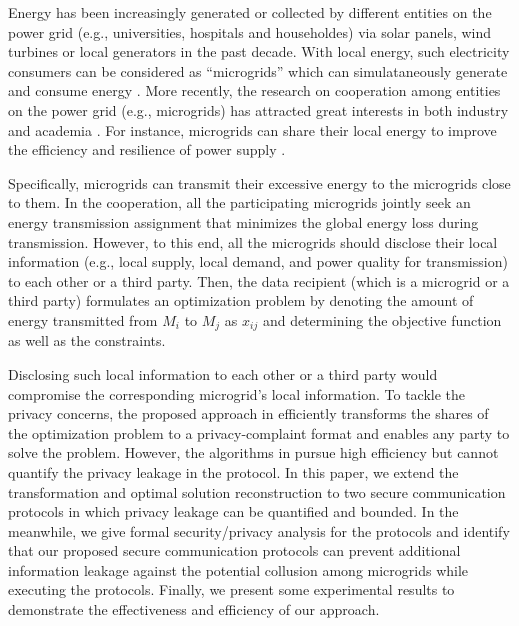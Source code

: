 
Energy has been increasingly generated or collected by different entities on the power grid (e.g., universities, hospitals and householdes) via solar panels, wind turbines or local generators in the past decade. With local energy, such electricity consumers can be considered as ``microgrids'' which can simulataneously generate and consume energy \cite{SaadHPB12,ArboleyaGCFMSBP15}. More recently, the research on cooperation among entities on the power grid (e.g., microgrids) has attracted great interests in both industry and academia \cite{SaadHPB12}. For instance, microgrids can share their local energy to improve the efficiency and resilience of power supply \cite{HongIJER15}. 

Specifically, microgrids can transmit their excessive energy to the microgrids close to them. In the cooperation, all the participating microgrids jointly seek an energy transmission assignment that minimizes the global energy loss during transmission. However, to this end, all the microgrids should disclose their local information (e.g., local supply, local demand, and power quality for transmission) to each other or a third party. Then, the data recipient (which is a microgrid or a third party) formulates an optimization problem by denoting the amount of energy transmitted from $M_i$ to $M_j$ as $x_{ij}$ and determining the objective function as well as the constraints. 


Disclosing such local information to each other or a third party would compromise the corresponding microgrid's local information. To tackle the privacy concerns, the proposed approach in \cite{HongIJER15} efficiently transforms the shares of the optimization problem to a privacy-complaint format and enables any party to solve the problem. However, the algorithms in \cite{HongIJER15} pursue high efficiency but cannot quantify the privacy leakage in the protocol. In this paper, we extend the transformation and optimal solution reconstruction to two secure communication protocols in which privacy leakage can be quantified and bounded. In the meanwhile, we give formal security/privacy analysis for the protocols and identify that our proposed secure communication protocols can prevent additional information leakage against the potential collusion among microgrids while executing the protocols. Finally, we present some experimental results to demonstrate the effectiveness and efficiency of our approach.